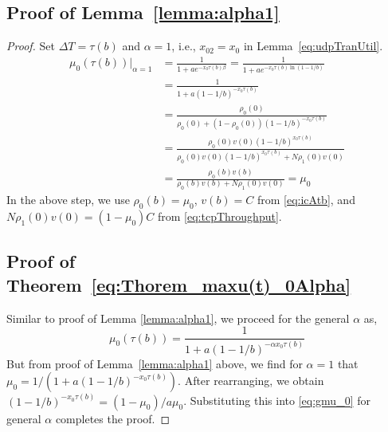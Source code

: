 \documentclass{IEEEtran}
\begin{document}
      \subsection*{Proof of Lemma~\ref{lemma:alpha1}}
      \vspace{3mm}
     \begin{proof}
    Set $\Delta T= \tau(b)$ and $\alpha=1$, i.e., $x_{02}=x_0$ in Lemma~\ref{eq:udpTranUtil}.
    \begin{subequations}
    \begin{align}
        \mu_0(\tau(b))|_{\alpha=1}&= \frac{1}{1+ae^{-x_0\tau(b)\beta}}=\frac{1}{1+ae^{-x_0\tau(b)\ln(1-1/b)}} \nonumber \\
        &=\frac{1}{1+a(1-1/b)^{-x_0\tau(b)}} \label{subeqn1} \\
        &=\frac{\rho_0(0)}{\rho_0(0)+(1-\rho_0(0))(1-1/b)^{-x_0\tau(b)}} \label{subeqn2} \\
        &=\frac{\rho_0(0)v(0)(1-1/b)^{x_0\tau(b)}}{\rho_0(0)v(0)(1-1/b)^{x_0\tau(b)}+N\rho_1(0)v(0)} \label{subeqn3} \\
       &=\frac{\rho_0(b)v(b)}{\rho_0(b)v(b)+N\rho_1(0)v(0)}=\mu_0  \label{subeqn4}
    \end{align}
    \end{subequations}
    In the above step, we use $\rho_0(b)=\mu_0$, $v(b)=C$ from \eqref{eq:icAtb}, and $N\rho_1(0)v(0)=(1-\mu_0)C$ from \eqref{eq:tcpThroughput}.
    \subsection*{Proof of Theorem~\ref{eq:Thorem_maxu(t)_0Alpha}}
    Similar to proof of Lemma \ref{lemma:alpha1}, we proceed for the general $\alpha$ as,
    \begin{equation}
        \mu_0(\tau(b))=\frac{1}{1+a(1-1/b)^{-\alpha x_0\tau(b)}} \label{eq:gmu_0}
    \end{equation}
    But from proof of Lemma~\ref{lemma:alpha1} above, we find for $\alpha=1$ that $\mu_0=1/(1+a(1-1/b)^{-x_0\tau(b)})$. After rearranging,  we obtain $(1-1/b)^{-x_0\tau(b)}=(1-\mu_0)/a\mu_0$. Substituting this into \eqref{eq:gmu_0} for general $\alpha$ completes the proof.
    \end{proof}
\end{document}
